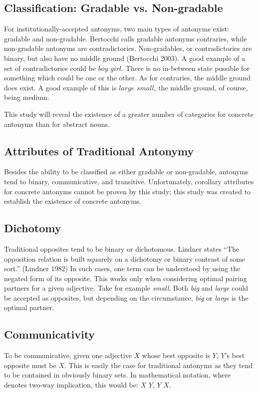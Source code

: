 \subsection {Classification: Gradable vs. Non-gradable} For institutionally-accepted antonyms, two main types of antonyms exist: gradable and non-gradable. Bertocchi calls gradable antonyms contraries, while non-gradable antonyms are contradictories.   Non-gradables, or contradictories are binary, but also have no middle ground (Bertocchi 2003).  A good example of a set of contradictories could be $boy$ \opp $girl$.  There is no in-between state possible for something which could be one or the other.  As for contraries, the middle ground does exist.  A good example of this is $large$ \opp $small$, the middle ground, of course, being medium.  

This study will reveal the existence of a greater number of categories for concrete antonyms than for abstract nouns. 

\subsection {Attributes of Traditional Antonymy} Besides the ability to be classified as either gradable or non-gradable, antonyms tend to binary, communicative, and transitive.  Unfortunately, corollary attributes for concrete antonyms cannot be proven by this study; this study was created to establish the existence of concrete antonyms.

\subsection {Dichotomy} Traditional opposites tend to be binary or dichotomous.  Lindner states ``The opposition relation is built squarely on a dichotomy or binary contrast of some sort.'' (Lindner 1982) In such cases, one term can be understood by using the negated form of its opposite.  This works only when considering optimal pairing partners for a given adjective.  Take for example \textit{small}.  Both \textit{big} and \textit{large} could be accepted as opposites, but depending on the circumstance, \textit{big} or \textit{large} is the optimal partner.

\subsection {Communicativity} To be communicative, given one adjective $X$ whose best opposite is $Y$, $Y$’s best opposite must be $X$.  This is easily the case for traditional antonyms as they tend to be contained in obviously binary sets. In mathematical notation, where  denotes two-way implication, this would be: $X$ \opp $Y$, $Y$ \opp $X$.

